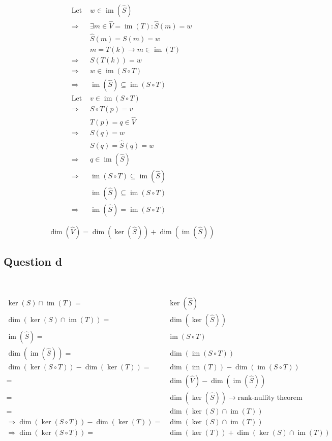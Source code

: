\documentclass{article}
\DeclareMathOperator{\im}{im}
\begin{document}
~

\begin{equation*}
\tag{conclusion 2}
\begin{split}
\text{Let }&w \in \im(\hat{S})\\
\Rightarrow &\exists m\in \hat{V} =\im(T) : \hat{S}(m)=w\\
&\hat{S}(m)=S(m)=w\\
&m=T(k) \rightarrow m\in \im(T)\\
\Rightarrow &S(T(k))=w\\
\Rightarrow &w\in\im (S\circ T)\\
\Rightarrow &\im(\hat{S}) \subseteq\im (S\circ T)\\
\text{Let } &v\in\im(S\circ T)\\
\Rightarrow &S\circ T(p)=v\\
&T(p)=q\in \hat{V}\\
\Rightarrow &S(q)=w\\
&S(q)=\hat{S}(q)=w\\
\Rightarrow &q\in\im(\hat{S})\\
\Rightarrow &\im(S\circ T)\subseteq\im(\hat{S})\\
&\im(\hat{S}) \subseteq\im (S\circ T)\\
\Rightarrow & \im(\hat{S}) =\im (S\circ T)
\end{split}
\end{equation*}

\begin{equation*}
\dim(\hat{V})=\dim(\ker(\hat{S}))+\dim(\im(\hat{S}))
\end{equation*}

\subsection{Question d}

~

\begin{equation*}
\begin{split}
\ker(S)\cap\im(T)=&\ker(\hat{S})\\
\dim(\ker(S)\cap\im(T))=&\dim(\ker(\hat{S}))\\
\im(\hat{S}) =&\im (S\circ T)\\
\dim(\im(\hat{S}))=&\dim(\im (S\circ T))\\
\dim(\ker(S\circ T))-\dim(\ker(T))=&\dim(\im(T))-\dim(\im(S\circ T))\\
=&\dim(\hat{V})-\dim(\im(\hat{S}))\\
=&\dim(\ker(\hat{S}))\rightarrow\text{rank-nullity theorem}\\
=&\dim(\ker(S)\cap\im(T))\\
\Rightarrow \dim(\ker(S\circ T))-\dim(\ker(T))=&\dim(\ker(S)\cap\im(T))\\
\Rightarrow \dim(\ker(S\circ T))=&\dim(\ker(T))+\dim(\ker(S)\cap\im(T))\\
\end{split}
\end{equation*}
\end{document}
